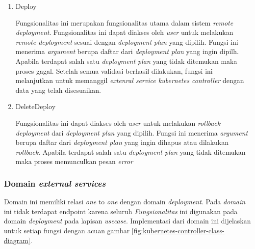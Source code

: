 \begin{enumerate}
  \item Deploy

        Fungsionalitas ini merupakan fungsionalitas utama dalam sistem \textit{remote deployment}. Fungsionalitas ini dapat diakses oleh \textit{user} untuk melakukan \textit{remote deployment} sesuai dengan \textit{deployment plan} yang dipilih. Fungsi ini menerima \textit{argument} berupa daftar dari \textit{deployment plan} yang ingin dipilh. Apabila terdapat salah satu \textit{deployment plan} yang tidak ditemukan maka proses gagal. Setelah semua validasi berhasil dilakukan, fungsi ini melanjutkan untuk memanggil \textit{extenral service kubernetes controller} dengan data yang telah disesuaikan.

  \item DeleteDeploy

        Fungsionalitas ini dapat diakses oleh \textit{user} untuk melakukan \textit{rollback deployment} dari \textit{deployment plan} yang dipilih. Fungsi ini menerima \textit{argument} berupa daftar dari \textit{deployment plan} yang ingin dihapus atau dilakukan \textit{rollback}. Apabila terdapat salah satu \textit{deployment plan} yang tidak ditemukan maka proses memunculkan pesan \textit{error}

\end{enumerate}

\subsubsection{Domain \textit{external services}}

Domain ini memiliki relasi \textit{one} to \textit{one} dengan domain \textit{deployment}. Pada \textit{domain} ini tidak terdapat endpoint karena seluruh \textit{Fungsionalitas} ini digunakan pada domain \textit{deployment} pada lapisan \textit{usecase}. Implementasi dari domain ini dijelaskan untuk setiap fungsi dengan acuan gambar \ref{fig:kubernetes-controller-class-diagram}.

\pagebreak

